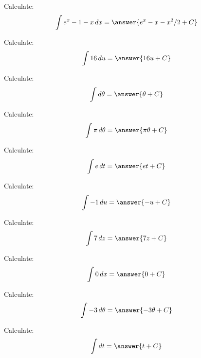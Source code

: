 \documentclass{ximera}
\begin{document}
\begin{exercise}
\begin{problem} Calculate:
\[
\int e^x - 1 - x \d x = \answer{e^x-x-x^2/2+C}
\]

\end{problem}



\begin{problem} Calculate:
\[
\int 16 \d u = \answer{16u+C}
\]

\end{problem}


\begin{problem} Calculate:
\[
\int  \d \theta = \answer{\theta+C}
\]

\end{problem}

\begin{problem} Calculate:
\[
\int \pi \d \theta = \answer{\pi\theta +C}
\]

\end{problem}


\begin{problem} Calculate:
\[
\int e \d t = \answer{e t + C}
\]

\end{problem}



\begin{problem} Calculate:
\[
\int -1 \d u = \answer{-u+C}
\]

\end{problem}


\begin{problem} Calculate:
\[
\int 7 \d z = \answer{7z+C}
\]

\end{problem}


\begin{problem} Calculate:
\[
\int 0 \d x = \answer{0+C}
\]

\end{problem}

\begin{problem} Calculate:
\[
\int -3 \d \theta = \answer{-3\theta+C}
\]

\end{problem}

\begin{problem} Calculate:
\[
\int  \d t = \answer{t+C}
\]

\end{problem}


\end{exercise}
\end{document}
